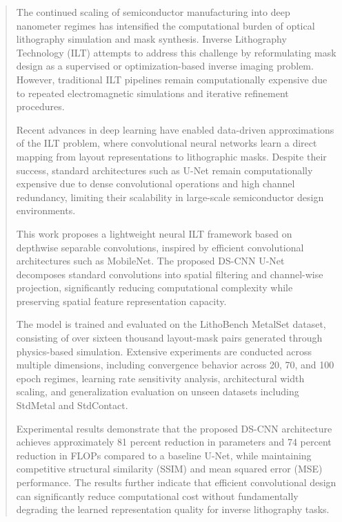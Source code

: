\documentclass[conference]{IEEEtran}
\begin{document}
\begin{abstract}

The continued scaling of semiconductor manufacturing into deep nanometer regimes has intensified the computational burden of optical lithography simulation and mask synthesis. Inverse Lithography Technology (ILT) attempts to address this challenge by reformulating mask design as a supervised or optimization-based inverse imaging problem. However, traditional ILT pipelines remain computationally expensive due to repeated electromagnetic simulations and iterative refinement procedures.

Recent advances in deep learning have enabled data-driven approximations of the ILT problem, where convolutional neural networks learn a direct mapping from layout representations to lithographic masks. Despite their success, standard architectures such as U-Net remain computationally expensive due to dense convolutional operations and high channel redundancy, limiting their scalability in large-scale semiconductor design environments.

This work proposes a lightweight neural ILT framework based on depthwise separable convolutions, inspired by efficient convolutional architectures such as MobileNet. The proposed DS-CNN U-Net decomposes standard convolutions into spatial filtering and channel-wise projection, significantly reducing computational complexity while preserving spatial feature representation capacity.

The model is trained and evaluated on the LithoBench MetalSet dataset, consisting of over sixteen thousand layout-mask pairs generated through physics-based simulation. Extensive experiments are conducted across multiple dimensions, including convergence behavior across 20, 70, and 100 epoch regimes, learning rate sensitivity analysis, architectural width scaling, and generalization evaluation on unseen datasets including StdMetal and StdContact.

Experimental results demonstrate that the proposed DS-CNN architecture achieves approximately 81 percent reduction in parameters and 74 percent reduction in FLOPs compared to a baseline U-Net, while maintaining competitive structural similarity (SSIM) and mean squared error (MSE) performance. The results further indicate that efficient convolutional design can significantly reduce computational cost without fundamentally degrading the learned representation quality for inverse lithography tasks.

\end{abstract}
\end{document}
